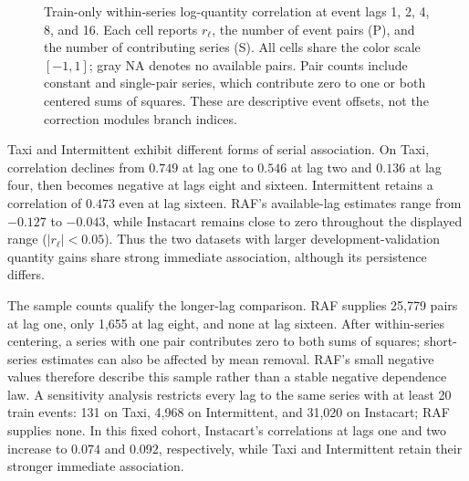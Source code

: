 \documentclass[runningheads]{llncs}
\providecommand{\Description}[1]{}
\begin{document}
\begin{figure}[t]
\caption{Train-only within-series log-quantity correlation at event lags 1, 2, 4, 8, and 16. Each cell reports $r_{\ell}$, the number of event pairs (P), and the number of contributing series (S). All cells share the color scale $[-1,1]$; gray NA denotes no available pairs. Pair counts include constant and single-pair series, which contribute zero to one or both centered sums of squares. These are descriptive event offsets, not the correction module\textquotesingle{}s branch indices.}
\label{fig:train-lag-correlation}
\Description{A four-by-five heatmap. Taxi correlation declines from 0.749 at lag one to negative values at lags eight and sixteen. Intermittent remains positive, declining from 0.928 to 0.473. RAF has small negative correlations through lag eight and no pairs at lag sixteen. Instacart correlations remain close to zero. Pair and series counts are printed in every cell.}
\end{figure}

Taxi and Intermittent exhibit different forms of serial association.
On Taxi, correlation declines from $0.749$ at lag one to $0.546$ at lag two
and $0.136$ at lag four, then becomes negative at lags eight and sixteen.
Intermittent retains a correlation of $0.473$ even at lag sixteen.
RAF's available-lag estimates range from $-0.127$ to $-0.043$, while
Instacart remains close to zero throughout the displayed range
($|r_{\ell}|<0.05$). Thus the two datasets with larger development-validation quantity gains
share strong immediate association, although its persistence differs.

The sample counts qualify the longer-lag comparison. RAF supplies 25,779
pairs at lag one, only 1,655 at lag eight, and none at lag sixteen.
After within-series centering, a series with one pair contributes zero
to both sums of squares; short-series estimates can also be affected by
mean removal. RAF's small negative values therefore describe this sample
rather than a stable negative dependence law. A sensitivity analysis
restricts every lag to the same series with at least 20 train events:
131 on Taxi, 4,968 on Intermittent, and 31,020 on Instacart; RAF supplies
none. In this fixed cohort, Instacart's correlations at lags one and two
increase to $0.074$ and $0.092$, respectively, while Taxi and
Intermittent retain their stronger immediate association.
\end{document}
